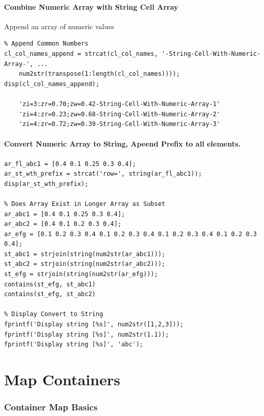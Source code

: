 \documentclass[
]{book}
\begin{document}
\hypertarget{combine-numeric-array-with-string-cell-array}{%
\paragraph{Combine Numeric Array with String Cell Array}\label{combine-numeric-array-with-string-cell-array}}

Append an array of numeric values

\begin{verbatim}
% Append Common Numbers
cl_col_names_append = strcat(cl_col_names, '-String-Cell-With-Numeric-Array-', ...
    num2str(transpose(1:length(cl_col_names))));
disp(cl_col_names_append);

    'zi=3:zr=0.70;zw=0.42-String-Cell-With-Numeric-Array-1'
    'zi=4:zr=0.23;zw=0.68-String-Cell-With-Numeric-Array-2'
    'zi=4:zr=0.72;zw=0.39-String-Cell-With-Numeric-Array-3'
\end{verbatim}

\hypertarget{convert-numeric-array-to-string-apeend-prefix-to-all-elements.}{%
\paragraph{Convert Numeric Array to String, Apeend Prefix to all elements.}\label{convert-numeric-array-to-string-apeend-prefix-to-all-elements.}}

\begin{verbatim}
ar_fl_abc1 = [0.4 0.1 0.25 0.3 0.4];
ar_st_wth_prefix = strcat('row=', string(ar_fl_abc1));
disp(ar_st_wth_prefix);

% Does Array Exist in Longer Array as Subset
ar_abc1 = [0.4 0.1 0.25 0.3 0.4];
ar_abc2 = [0.4 0.1 0.2 0.3 0.4];
ar_efg = [0.1 0.2 0.3 0.4 0.1 0.2 0.3 0.4 0.1 0.2 0.3 0.4 0.1 0.2 0.3 0.4];
st_abc1 = strjoin(string(num2str(ar_abc1)));
st_abc2 = strjoin(string(num2str(ar_abc2)));
st_efg = strjoin(string(num2str(ar_efg)));
contains(st_efg, st_abc1)
contains(st_efg, st_abc2)

% Display Convert to String
fprintf('Display string [%s]', num2str([1,2,3]));
fprintf('Display string [%s]', num2str(1.1));
fprintf('Display string [%s]', 'abc');
\end{verbatim}

\hypertarget{map-containers}{%
\section{Map Containers}\label{map-containers}}

\hypertarget{container-map-basics}{%
\subsubsection{Container Map Basics}\label{container-map-basics}}
\end{document}
